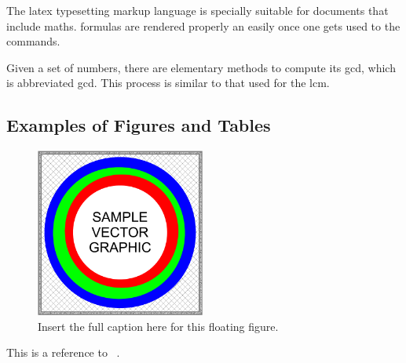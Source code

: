 The \Gls{latex} typesetting markup language is specially suitable for documents that include \gls{maths}.
\Glspl{formula} are rendered properly an easily once one gets used to the commands.

Given a set of numbers, there are elementary methods to compute its \acrlong{gcd}, which is abbreviated \acrshort{gcd}.
This process is similar to that used for the \acrfull{lcm}.


\subsection{Examples of Figures and Tables}
\label{Section:ChapAbbr:SomeExamples:FiguresTables}

\begin{figure}
\centering\CaptionFontSize
\includegraphics[height=15em]
{Figures/Figure-ChapAbbr-FigureExampleA}
\caption[Insert an abbreviated caption here to show in the List of Figures (optional)]
{Insert the full caption here for this floating figure.}
\label{Figure:ChapAbbr:FigureExampleA}
\end{figure}

This is a reference to \Figure~.
\lipsum[8]

